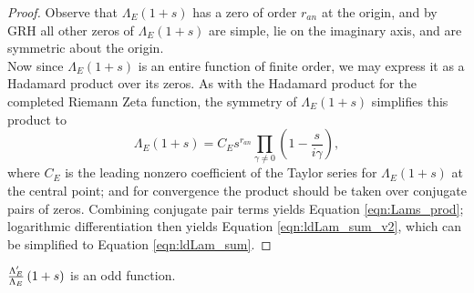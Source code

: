 \begin{proof}
Observe that $\Lambda_E(1+s)$ has a zero of order $r_{an}$ at the origin, and by GRH all other zeros of $\Lambda_E(1+s)$ are simple, lie on the imaginary axis, and are symmetric about the origin. \\

Now since $\Lambda_E(1+s)$ is an entire function of finite order, we may express it as a Hadamard product over its zeros. As with the Hadamard product for the completed Riemann Zeta function, the symmetry of $\Lambda_E(1+s)$ simplifies this product to
\begin{equation}
\Lambda_E(1+s) = C_E s^{r_{an}}\prod_{\gamma\ne0}\left(1-\frac{s}{i\gamma}\right),
\end{equation}
where $C_E$ is the leading nonzero coefficient of the Taylor series for $\Lambda_E(1+s)$ at the central point; and for convergence the product should be taken over conjugate pairs of zeros. Combining conjugate pair terms yields Equation \ref{eqn:Lams_prod}; logarithmic differentiation then yields Equation \ref{eqn:ldLam_sum_v2}, which can be simplified to Equation \ref{eqn:ldLam_sum}.
\end{proof}

\begin{corollary}
$\frac{\Lambda_E^{\prime}}{\Lambda_E}\left(1+s\right)$ is an odd function.
\end{corollary}

